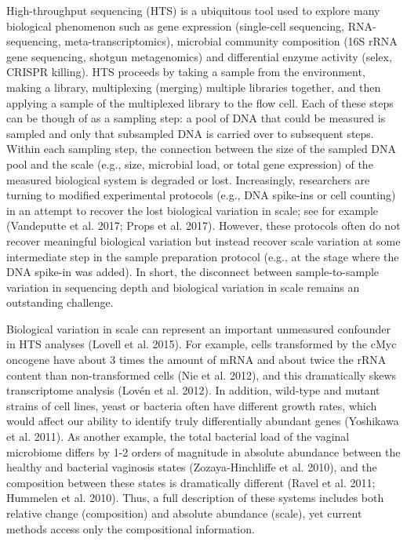 \documentclass[
]{article}
\begin{document}
High-throughput sequencing (HTS) is a ubiquitous tool used to explore
many biological phenomenon such as gene expression (single-cell
sequencing, RNA-sequencing, meta-transcriptomics), microbial community
composition (16S rRNA gene sequencing, shotgun metagenomics) and
differential enzyme activity (selex, CRISPR killing). HTS proceeds by
taking a sample from the environment, making a library, multiplexing
(merging) multiple libraries together, and then applying a sample of the
multiplexed library to the flow cell. Each of these steps can be though
of as a sampling step: a pool of DNA that could be measured is sampled
and only that subsampled DNA is carried over to subsequent steps. Within
each sampling step, the connection between the size of the sampled DNA
pool and the scale (e.g., size, microbial load, or total gene
expression) of the measured biological system is degraded or lost.
Increasingly, researchers are turning to modified experimental protocols
(e.g., DNA spike-ins or cell counting) in an attempt to recover the lost
biological variation in scale; see for example (Vandeputte et al. 2017;
Props et al. 2017). However, these protocols often do not recover
meaningful biological variation but instead recover scale variation at
some intermediate step in the sample preparation protocol (e.g., at the
stage where the DNA spike-in was added). In short, the disconnect
between sample-to-sample variation in sequencing depth and biological
variation in scale remains an outstanding challenge.

Biological variation in scale can represent an important unmeasured
confounder in HTS analyses (Lovell et al. 2015). For example, cells
transformed by the cMyc oncogene have about 3 times the amount of mRNA
and about twice the rRNA content than non-transformed cells (Nie et al.
2012), and this dramatically skews transcriptome analysis (Lovén et al.
2012). In addition, wild-type and mutant strains of cell lines, yeast or
bacteria often have different growth rates, which would affect our
ability to identify truly differentially abundant genes (Yoshikawa et
al. 2011). As another example, the total bacterial load of the vaginal
microbiome differs by 1-2 orders of magnitude in absolute abundance
between the healthy and bacterial vaginosis states (Zozaya-Hinchliffe et
al. 2010), and the composition between these states is dramatically
different (Ravel et al. 2011; Hummelen et al. 2010). Thus, a full
description of these systems includes both relative change (composition)
and absolute abundance (scale), yet current methods access only the
compositional information.
\end{document}
